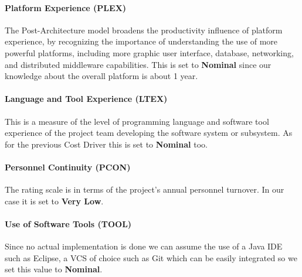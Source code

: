 \paragraph{Platform Experience (PLEX)} The Post-Architecture model broadens the productivity influence of platform experience, by recognizing the importance of understanding the use of more powerful platforms, including more graphic user interface, database, networking, and distributed middleware capabilities.
This is set to \textbf{Nominal} since our knowledge about the overall platform is about 1 year.
   

\paragraph{Language and Tool Experience (LTEX)} This is a measure of the level of programming language and software tool experience of the project team developing the software system or subsystem. As for the previous Cost Driver this is set to \textbf{Nominal} too.


\paragraph{Personnel Continuity (PCON)} The rating scale is in terms of the project's annual personnel turnover. In our case it is set to \textbf{Very Low}.


\paragraph{Use of Software Tools (TOOL)} Since no actual implementation is done we can assume the use of a Java IDE such as Eclipse, a VCS of choice such as Git which can be easily integrated so we set this value to \textbf{Nominal}.


